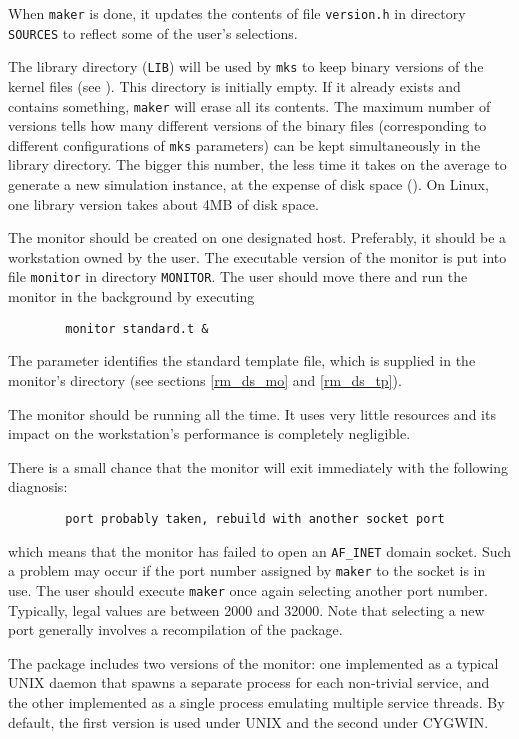 When {\tt maker} is done, it updates the contents of file
{\tt version.h} in directory {\tt SOURCES} to reflect some of the user's
selections.

The library directory ({\tt LIB}) will be used by
{\tt mks} to keep binary versions of the kernel files (see ).
This directory is initially empty.
If it already exists and contains something, {\tt maker} will erase all its
contents.
The maximum number of versions tells how many different versions of the binary
files (corresponding to different configurations of {\tt mks} parameters)
can be kept simultaneously in the library directory.
The bigger this number, the less time it takes on the average to generate a
new simulation instance, at the expense of disk space ().
On Linux, one library version takes about 4MB of disk space.

The monitor should be created on one designated host.
Preferably, it should be a workstation owned by the user.
The executable version of the monitor is put into file {\tt monitor}
in directory {\tt MONITOR}.
The user should move there and run the monitor in the background by
executing
\begin{verbatim}
        monitor standard.t &
\end{verbatim}
The parameter identifies the standard template file, which is supplied
in the monitor's directory (see sections \ref{rm_ds_mo} and \ref{rm_ds_tp}).

The monitor should be running all the time.
It uses very little resources and its impact on the workstation's
performance is completely negligible.

There is a small
chance that the monitor will exit immediately with the following diagnosis:
\begin{verbatim}
        port probably taken, rebuild with another socket port
\end{verbatim}
which means that the monitor has failed to open an {\tt AF\_INET} domain socket.
Such a problem may occur if the port number assigned by {\tt maker} to
the socket is in use.
The user should execute {\tt maker} once again selecting another port number.
Typically, legal values are between 2000 and 32000.
Note that selecting a new port generally involves a recompilation of
the package.

The package includes two versions of the monitor: one implemented as a
typical UNIX daemon that spawns a separate process for each non-trivial
service, and the other implemented as a single process emulating multiple
service threads.
By default, the first version is used under UNIX and the second under
CYGWIN.

